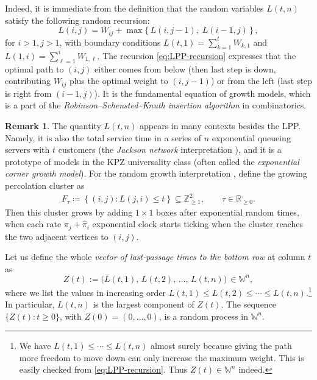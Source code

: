 \documentclass[letterpaper,11pt,oneside,reqno]{article}
\numberwithin{equation}{section}
\theoremstyle{definition}
\newtheorem{remark}[proposition]{Remark}
\begin{document}
Indeed, it is immediate from the definition that the random
variables $L(t,n)$ satisfy the following random recursion:
\begin{equation}\label{eq:LPP-recursion}
L(i,j) = W_{ij} + \max\{\, L(i,j-1),\; L(i-1,j)\,\}\,,
\end{equation}
for $i>1, j>1$, with boundary conditions $L(t,1) =
\sum_{k=1}^t W_{k,1}$ and $L(1,i) =
\sum_{\ell=1}^i W_{1,\ell}$.
The recursion \eqref{eq:LPP-recursion} expresses
that the optimal path to $(i,j)$ either comes from below
(then last step is down, contributing $W_{ij}$ plus the
optimal weight to $(i,j-1)$) or from the left (last step is
right from $(i-1,j)$). It is the fundamental equation of
growth models, which is a part of the
\emph{Robinson--Schensted--Knuth insertion algorithm} in
combinatorics.


\begin{remark}
	The quantity $L(t,n)$ appears in many contexts besides the LPP.
	Namely,
it is also the total
service time in a series of $n$ exponential queueing servers
with $t$ customers (the \emph{Jackson network}
interpretation \cite{Baryshnikov_GUE2001}), and it is a
prototype of models in the KPZ universality class (often
called the \emph{exponential corner growth model}).
For the random growth interpretation \cite{johansson2000shape},
define the growing percolation cluster as
\begin{equation*}
\begin{split}
F_\tau\coloneqq
\left\{ (i,j)\colon L(j,i)\le t \right\} \subseteq \mathbb{Z}_{\ge1}^2,
\qquad \tau \in \mathbb{R}_{\ge0}.
\end{split}
\end{equation*}
Then this cluster grows by adding $1\times 1$ boxes
after exponential random times, when
each rate $\pi_j+\hat \pi_i$
exponential clock starts ticking
when the cluster reaches the two adjacent vertices
to $(i,j)$.
\end{remark}

Let us define the whole \emph{vector of last-passage times to the bottom row} at column $t$ as
\[ Z(t) := \big( L(t,1),\, L(t,2),\, \dots,\, L(t,n)\big)\,\in \mathbb{W}^n, \]
where we list the values in increasing order $L(t,1)\le
L(t,2)\le \cdots \le L(t,n)$.\footnote{We have $L(t,1)\le
\cdots\le L(t,n)$ almost surely because giving the path more
freedom to move down can only increase the maximum weight.
This is easily checked from \eqref{eq:LPP-recursion}. Thus
$Z(t)\in \mathbb{W}^n$ indeed.} In particular, $L(t,n)$ is
the largest component of $Z(t)$. The sequence
$\{Z(t):t\ge0\}$, with $Z(0)=(0,\dots,0)$, is a random
process in $\mathbb{W}^n$.
\end{document}
